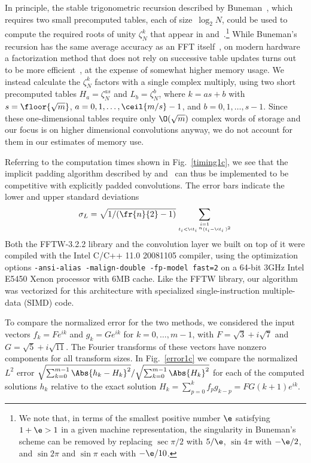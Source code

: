 \documentclass[final]{siamltex}
\begin{document}
In principle, the stable trigonometric recursion described by
Buneman~\cite{Buneman87}, which requires two small precomputed tables, each
of size~$\log_2 N$, could be used to compute the required roots of unity
$\zeta_N^k$ that appear in 
and~.\footnote{We note that, in terms of the smallest
positive number $\e$
satisfying $1+\e > 1$ in a given machine representation, the singularity in
Buneman's scheme can be removed by replacing $\sec{\pi/2}$ with  $5/\e$,
$\sin 4\pi$ with $-\e/2$, and $\sin{2\pi}$ and $\sin{\pi}$ each with $-\e/10$.}
While Buneman's recursion has the same average accuracy as an FFT
itself~\cite{Tasche02}, on modern hardware a factorization method that does
not rely on successive table updates turns out to be more
efficient~\cite{Johnson09}, at the expense of somewhat higher memory usage.
We instead calculate the $\zeta_N^k$ factors with a single complex
multiply, using two short precomputed tables $H_a=\zeta_N^{as}$ and
$L_b=\zeta_N^b$, where $k=as+b$ with $s=\floor{\sqrt m}$,
$a=0,1,\ldots,\ceil{m/s}-1$, and $b=0,1,\ldots,s-1$. Since these
one-dimensional tables require only $\O(\sqrt{m})$ complex words of
storage and our focus is on higher dimensional convolutions anyway, we do
not account for them in our estimates of memory use. 

Referring to the computation times shown in Fig.~\ref{timing1c},
we see that the implicit padding algorithm described by  
and~
can thus be implemented to be competitive with explicitly padded
convolutions. The error bars indicate the lower and upper standard deviations
$$
\sigma_L=\sqrt{1/(\fr{n}{2}-1)}\sum_{i=1\atop{t_i < \<t_i\>}^n (t_i-\<t_i\>)^2}
$$
Both the FFTW-3.2.2 library and the convolution layer we built on
top of it were compiled with the Intel C/C++ 11.0 20081105 compiler, using
the optimization options {\tt -ansi-alias -malign-double -fp-model fast=2}
on a 64-bit 3GHz Intel E5450 Xenon processor with 6MB cache. Like the FFTW
library, our algorithm was vectorized for this architecture with
specialized single-instruction multiple-data (SIMD) code.

To compare the normalized error for the two methods, we considered the
input vectors $f_k=F e^{ik}$ and $g_k=G e^{ik}$ for $k=0,\ldots,m-1$,
with $F=\sqrt3+ i\sqrt 7$ and $G=\sqrt5+ i\sqrt {11}$.
The Fourier transforms of these vectors have nonzero components for all
transform sizes.
In Fig.~\ref{error1c} we compare the normalized~$L^2$ error 
$\sqrt{\sum_{k=0}^{m-1}\Abs{h_k-H_k}^2}/\sqrt{\sum_{k=0}^{m-1} \Abs{H_k}^2}$
for each of the computed solutions $h_k$ relative to the exact solution 
$H_k=\sum_{p=0}^k f_p g_{k-p}=FG (k+1) e^{ik}$.
\end{document}
